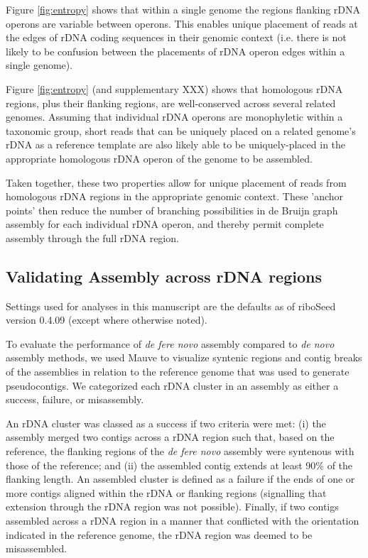 \documentclass[11pt]{article}
\begin{document}
\begin{linenumbers}
Figure \ref{fig:entropy} shows that within a single genome the regions flanking rDNA operons are variable between operons. This enables unique placement of reads at the edges of rDNA coding sequences in their genomic context (i.e. there is not likely to be confusion between the placements of rDNA operon edges within a single genome).


Figure \ref{fig:entropy} (and supplementary XXX) shows that homologous rDNA regions, plus their flanking regions, are well-conserved across several related genomes. Assuming that individual rDNA operons are monophyletic within a taxonomic group, short reads that can be uniquely placed on a related genome's rDNA as a reference template are also likely able to be uniquely-placed in the appropriate homologous rDNA operon of the genome to be assembled.


Taken together, these two properties allow for unique placement of reads from homologous rDNA regions in the appropriate genomic context. These 'anchor points' then reduce the number of branching possibilities in de Bruijn graph assembly for each individual rDNA operon, and thereby permit complete assembly through the full rDNA region.


\subsection*{Validating Assembly across rDNA regions}

Settings used for analyses in this manuscript are the defaults as of riboSeed version 0.4.09 (except where otherwise noted).


To evaluate the performance of \textit{de fere novo} assembly compared to \textit{de novo} assembly methods, we used Mauve to visualize syntenic regions and contig breaks of the assemblies in relation to the reference genome that was used to generate pseudocontigs. We categorized each rDNA cluster in an assembly as either a success, failure, or misassembly.


An rDNA cluster was classed as a success if two criteria were met: (i) the assembly merged two contigs across a rDNA region such that, based on the reference, the flanking regions of the \textit{de fere novo} assembly were syntenous with those of the reference; and (ii) the assembled contig extends at least 90\% of the flanking length. An assembled cluster is defined as a failure if the ends of one or more contigs aligned within the rDNA or flanking regions (signalling that extension through the rDNA region was not possible). Finally, if two contigs assembled across a rDNA region in a manner that conflicted with the orientation indicated in the reference genome, the rDNA region was deemed to be misassembled.



\end{linenumbers}
\end{document}
